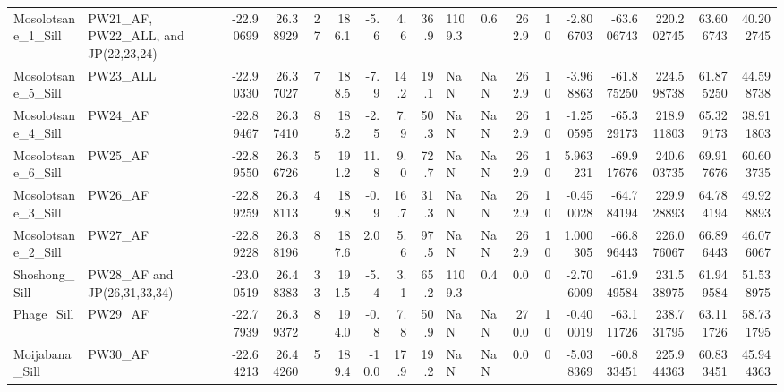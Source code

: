\documentclass{article}
\begin{document}
{\begin{tabular}{llrrrrrrrllrrrrrrr}
Mosolotsane\_1\_Sill       &  PW21\_AF, PW22\_ALL, and JP(22,23,24) & -22.90699 &   26.38929 &  27 &   186.1 &    -5.6 &   4.6 &  36.9 &  1109.3 &        0.6 &          262.9 &   10 &      -2.806703 & -63.606743 &  220.202745 &     63.606743 &      40.202745 \\
Mosolotsane\_5\_Sill       &                             PW23\_ALL & -22.90330 &   26.37027 &   7 &   188.5 &    -7.9 &  14.2 &  19.1 &     NaN &        NaN &          262.9 &   10 &      -3.968863 & -61.875250 &  224.598738 &     61.875250 &      44.598738 \\
Mosolotsane\_4\_Sill       &                              PW24\_AF & -22.89467 &   26.37410 &   8 &   185.2 &    -2.5 &   7.9 &  50.3 &     NaN &        NaN &          262.9 &   10 &      -1.250595 & -65.329173 &  218.911803 &     65.329173 &      38.911803 \\
Mosolotsane\_6\_Sill       &                              PW25\_AF & -22.89550 &   26.36726 &   5 &   191.2 &    11.8 &   9.0 &  72.7 &     NaN &        NaN &          262.9 &   10 &       5.963231 & -69.917676 &  240.603735 &     69.917676 &      60.603735 \\
Mosolotsane\_3\_Sill       &                              PW26\_AF & -22.89259 &   26.38113 &   4 &   189.8 &    -0.9 &  16.7 &  31.3 &     NaN &        NaN &          262.9 &   10 &      -0.450028 & -64.784194 &  229.928893 &     64.784194 &      49.928893 \\
Mosolotsane\_2\_Sill       &                              PW27\_AF & -22.89228 &   26.38196 &   8 &   187.6 &     2.0 &   5.6 &  97.5 &     NaN &        NaN &          262.9 &   10 &       1.000305 & -66.896443 &  226.076067 &     66.896443 &      46.076067 \\
Shoshong\_Sill            &          PW28\_AF and JP(26,31,33,34) & -23.00519 &   26.48383 &  33 &   191.5 &    -5.4 &   3.1 &  65.2 &  1109.3 &        0.4 &            0.0 &    0 &      -2.706009 & -61.949584 &  231.538975 &     61.949584 &      51.538975 \\
Phage\_Sill               &                              PW29\_AF & -22.77939 &   26.39372 &   8 &   194.0 &    -0.8 &   7.8 &  50.9 &     NaN &        NaN &          270.0 &   10 &      -0.400019 & -63.111726 &  238.731795 &     63.111726 &      58.731795 \\
Moijabana\_Sill           &                              PW30\_AF & -22.64213 &   26.44260 &   5 &   189.4 &   -10.0 &  17.9 &  19.2 &     NaN &        NaN &            0.0 &    0 &      -5.038369 & -60.833451 &  225.944363 &     60.833451 &      45.944363 \\

\end{tabular}}
\end{document}

